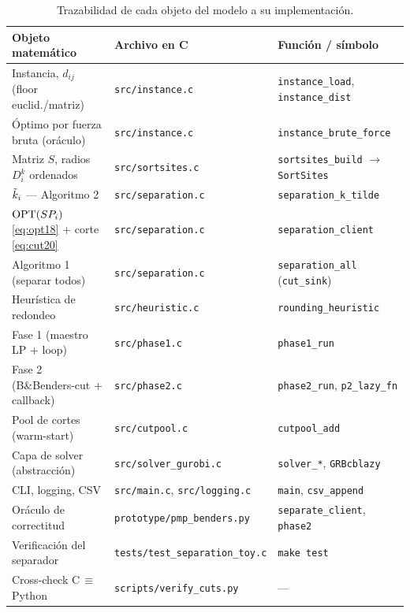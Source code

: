 \begin{table}[h]\centering\small
\begin{tabular}{>{\raggedright}p{5.2cm} l l}
\toprule
\textbf{Objeto matemático} & \textbf{Archivo en C} & \textbf{Función / símbolo} \\
\midrule
Instancia, $d_{ij}$ (floor euclid./matriz) & \texttt{src/instance.c} & \texttt{instance\_load}, \texttt{instance\_dist} \\
Óptimo por fuerza bruta (oráculo) & \texttt{src/instance.c} & \texttt{instance\_brute\_force} \\
Matriz $S$, radios $D^k_i$ ordenados & \texttt{src/sortsites.c} & \texttt{sortsites\_build} $\to$ \texttt{SortSites} \\
$\tilde{k}_i$ — Algoritmo 2 & \texttt{src/separation.c} & \texttt{separation\_k\_tilde} \\
$\mathrm{OPT}(SP_i)$ \eqref{eq:opt18} + corte \eqref{eq:cut20} & \texttt{src/separation.c} & \texttt{separation\_client} \\
Algoritmo 1 (separar todos) & \texttt{src/separation.c} & \texttt{separation\_all} (\texttt{cut\_sink}) \\
Heurística de redondeo & \texttt{src/heuristic.c} & \texttt{rounding\_heuristic} \\
Fase 1 (maestro LP + loop) & \texttt{src/phase1.c} & \texttt{phase1\_run} \\
Fase 2 (B\&Benders-cut + callback) & \texttt{src/phase2.c} & \texttt{phase2\_run}, \texttt{p2\_lazy\_fn} \\
Pool de cortes (warm-start) & \texttt{src/cutpool.c} & \texttt{cutpool\_add} \\
Capa de solver (abstracción) & \texttt{src/solver\_gurobi.c} & \texttt{solver\_*}, \texttt{GRBcblazy} \\
CLI, logging, CSV & \texttt{src/main.c}, \texttt{src/logging.c} & \texttt{main}, \texttt{csv\_append} \\
\midrule
Oráculo de correctitud & \texttt{prototype/pmp\_benders.py} & \texttt{separate\_client}, \texttt{phase2} \\
Verificación del separador & \texttt{tests/test\_separation\_toy.c} & \texttt{make test} \\
Cross-check C\,$\equiv$\,Python & \texttt{scripts/verify\_cuts.py} & — \\
\bottomrule
\end{tabular}
\caption{Trazabilidad de cada objeto del modelo a su implementación.}
\end{table}

